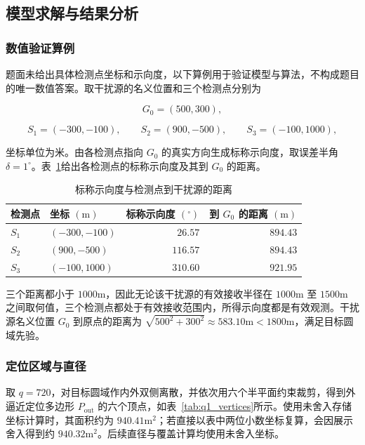 \subsection{模型求解与结果分析}

\subsubsection{数值验证算例}

题面未给出具体检测点坐标和示向度，以下算例用于验证模型与算法，不构成题目的唯一数值答案。取干扰源的名义位置和三个检测点分别为

\[
G_0=(500,300),
\]

\[
S_1=(-300,-100),\qquad
S_2=(900,-500),\qquad
S_3=(-100,1000),
\]

坐标单位为米。由各检测点指向 $G_0$ 的真实方向生成标称示向度，取误差半角 $\delta=1^\circ$。表~\ref{tab:q1_observations}给出各检测点的标称示向度及其到 $G_0$ 的距离。


\begin{table}[htbp]
\centering
\caption{标称示向度与检测点到干扰源的距离}
\label{tab:q1_observations}
\begin{tabular}{llrr}
\toprule
检测点 & 坐标 $(\mathrm{m})$ & 标称示向度 $(^\circ)$ & 到 $G_0$ 的距离 $(\mathrm{m})$ \\
\midrule
$S_1$ & $(-300,-100)$ & $26.57$ & $894.43$ \\
$S_2$ & $(900,-500)$ & $116.57$ & $894.43$ \\
$S_3$ & $(-100,1000)$ & $310.60$ & $921.95$ \\
\bottomrule
\end{tabular}
\end{table}

三个距离都小于 $1000\mathrm{m}$，因此无论该干扰源的有效接收半径在 $1000\mathrm{m}$ 至 $1500\mathrm{m}$ 之间取何值，三个检测点都处于有效接收范围内，所得示向度都是有效观测。干扰源名义位置 $G_0$ 到原点的距离为 $\sqrt{500^2+300^2}\approx583.10\mathrm{m}<1800\mathrm{m}$，满足目标圆域先验。

\subsubsection{定位区域与直径}

取 $q=720$，对目标圆域作内外双侧离散，并依次用六个半平面约束裁剪，得到外逼近定位多边形 $P_{\mathrm{out}}$ 的六个顶点，如表~\ref{tab:q1_vertices}所示。使用未舍入存储坐标计算时，其面积约为 $940.41\mathrm{m}^2$；若直接以表中两位小数坐标复算，会因展示舍入得到约 $940.32\mathrm{m}^2$。后续直径与覆盖计算均使用未舍入坐标。


